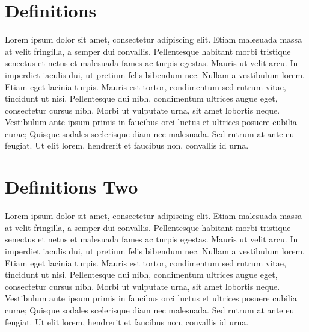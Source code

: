 \documentclass[epsf,a4paper]{book}
\begin{document}
\appendix

\chapter{Definitions}

Lorem ipsum dolor\cite{JS2015} sit amet, consectetur adipiscing\cite{rfc2119} elit. Etiam malesuada massa at velit fringilla, a semper dui convallis. Pellentesque habitant morbi tristique senectus et netus et malesuada fames ac turpis egestas. Mauris ut velit arcu. In imperdiet iaculis dui, ut pretium felis bibendum nec. Nullam a vestibulum lorem. Etiam eget lacinia turpis. Mauris est tortor, condimentum sed rutrum vitae, tincidunt ut nisi. Pellentesque dui nibh, condimentum ultrices augue eget, consectetur cursus nibh. Morbi ut vulputate urna, sit amet lobortis neque. Vestibulum ante ipsum primis in faucibus orci luctus et ultrices posuere cubilia curae; Quisque sodales scelerisque diam nec malesuada. Sed rutrum at ante eu feugiat. Ut elit lorem, hendrerit et faucibus non, convallis id urna.

\chapter{Definitions Two}

Lorem ipsum dolor\cite{JS2015} sit amet, consectetur adipiscing\cite{rfc2119} elit. Etiam malesuada massa at velit fringilla, a semper dui convallis. Pellentesque habitant morbi tristique senectus et netus et malesuada fames ac turpis egestas. Mauris ut velit arcu. In imperdiet iaculis dui, ut pretium felis bibendum nec. Nullam a vestibulum lorem. Etiam eget lacinia turpis. Mauris est tortor, condimentum sed rutrum vitae, tincidunt ut nisi. Pellentesque dui nibh, condimentum ultrices augue eget, consectetur cursus nibh. Morbi ut vulputate urna, sit amet lobortis neque. Vestibulum ante ipsum primis in faucibus orci luctus et ultrices posuere cubilia curae; Quisque sodales scelerisque diam nec malesuada. Sed rutrum at ante eu feugiat. Ut elit lorem, hendrerit et faucibus non, convallis id urna.

\backmatter{}



\end{document}
